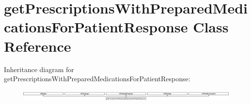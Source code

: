 \hypertarget{interfaceget_prescriptions_with_prepared_medications_for_patient_response}{}\section{get\+Prescriptions\+With\+Prepared\+Medications\+For\+Patient\+Response Class Reference}
\label{interfaceget_prescriptions_with_prepared_medications_for_patient_response}
Inheritance diagram for get\+Prescriptions\+With\+Prepared\+Medications\+For\+Patient\+Response\+:\begin{figure}[H]
\begin{center}
\leavevmode
\includegraphics[height=0.607046cm]{interfaceget_prescriptions_with_prepared_medications_for_patient_response}
\end{center}
\end{figure}
